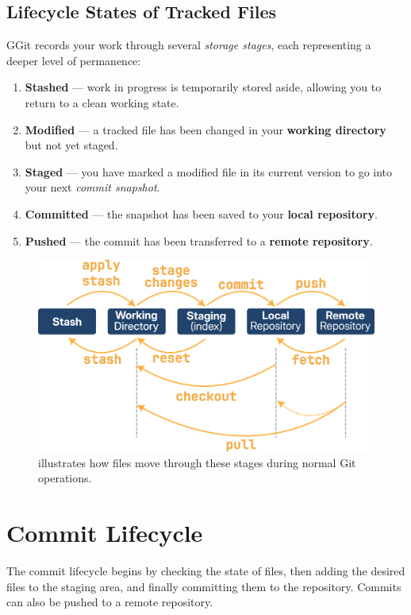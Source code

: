 \subsection{Lifecycle States of Tracked Files}
GGit records your work through several \textit{storage stages}, each representing a deeper level of permanence:
\begin{enumerate}
     \item \textbf{Stashed} --- work in progress is temporarily stored aside, allowing you to return to a clean working state.
    \item \textbf{Modified} --- a tracked file has been changed in your \textbf{working directory} but not yet staged.
    \item \textbf{Staged} --- you have marked a modified file in its current version to go into your next \textit{commit snapshot}.
    \item \textbf{Committed} ---  the snapshot has been saved to your \textbf{local repository}.
    \item \textbf{Pushed} --- the commit has been transferred to a \textbf{remote repository}.
\end{enumerate}

\begin{figure}[H]
\centering
    \centering
    \includegraphics[scale=1]{Images/recordingChanges.png}
    \caption{illustrates how files move through these stages during normal Git operations.}
\end{figure}
    
\section{Commit Lifecycle}
The commit lifecycle begins by checking the state of files, then adding the desired files to the staging area, and finally committing them to the repository. Commits can also be pushed to a remote repository.

